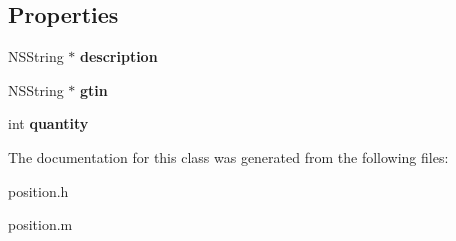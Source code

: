\subsection*{Properties}
\begin{DoxyCompactItemize}
\item 
\hypertarget{interfaceposition_afa049f41788faeac28d1ddabf29cde9b}{}N\+S\+String $\ast$ {\bfseries description}\label{interfaceposition_afa049f41788faeac28d1ddabf29cde9b}

\item 
\hypertarget{interfaceposition_a97c4699f223f2aae224fedb5a650f7ab}{}N\+S\+String $\ast$ {\bfseries gtin}\label{interfaceposition_a97c4699f223f2aae224fedb5a650f7ab}

\item 
\hypertarget{interfaceposition_a9c6fec122b9f1cc4b647b9e89b0396aa}{}int {\bfseries quantity}\label{interfaceposition_a9c6fec122b9f1cc4b647b9e89b0396aa}

\end{DoxyCompactItemize}


The documentation for this class was generated from the following files\+:\begin{DoxyCompactItemize}
\item 
position.\+h\item 
position.\+m\end{DoxyCompactItemize}
